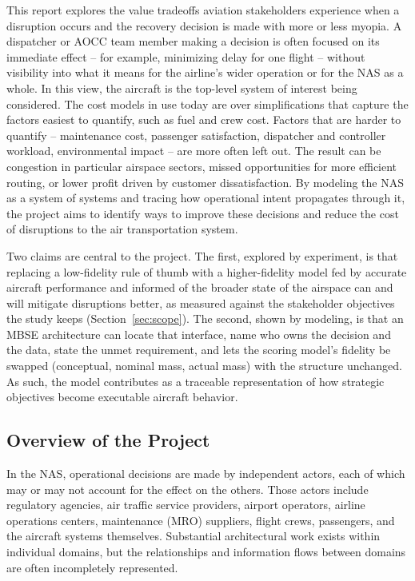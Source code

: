 This report explores the value tradeoffs aviation stakeholders experience when a disruption occurs and the recovery decision is made with more or less myopia. A dispatcher or AOCC team member making a decision is often focused on its immediate effect -- for example, minimizing delay for one flight -- without visibility into what it means for the airline's wider operation or for the NAS as a whole. In this view, the aircraft is the top-level system of interest being considered. The cost models in use today are over simplifications that capture the factors easiest to quantify, such as fuel and crew cost. Factors that are harder to quantify -- maintenance cost, passenger satisfaction, dispatcher and controller workload, environmental impact -- are more often left out. The result can be congestion in particular airspace sectors, missed opportunities for more efficient routing, or lower profit driven by customer dissatisfaction. By modeling the NAS as a system of systems and tracing how operational intent propagates through it, the project aims to identify ways to improve these decisions and reduce the cost of disruptions to the air transportation system.

Two claims are central to the project. The first, explored by experiment, is that replacing a low-fidelity rule of thumb with a higher-fidelity model fed by accurate aircraft performance and informed of the broader state of the airspace can and will mitigate disruptions better, as measured against the stakeholder objectives the study keeps (Section~\ref{sec:scope}). The second, shown by modeling, is that an MBSE architecture can locate that interface, name who owns the decision and the data, state the unmet requirement, and lets the scoring model's fidelity be swapped (conceptual, nominal mass, actual mass) with the structure unchanged. As such, the model contributes as a traceable representation of how strategic objectives become executable aircraft behavior.

\subsection{Overview of the Project}
\label{sec:overview}

In the NAS, operational decisions are made by independent actors, each of which may or may not account for the effect on the others. Those actors include regulatory agencies, air traffic service providers, airport operators, airline operations centers, maintenance (MRO) suppliers, flight crews, passengers, and the aircraft systems themselves. Substantial architectural work exists within individual domains, but the relationships and information flows between domains are often incompletely represented.

